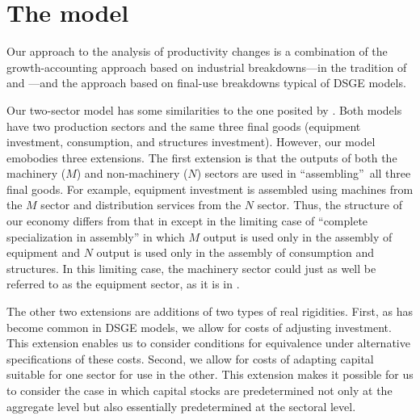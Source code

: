 \documentclass[12pt,fleqn]{article}
\begin{document}
\section{\protect\normalsize The model}

Our approach to the analysis of productivity changes is a
combination of the growth-accounting approach based on industrial
breakdowns---in the tradition of  and %
---and the approach based on final-use breakdowns typical of DSGE models.

Our two-sector model has some similarities to the one posited
by . Both models have two production
sectors and the same three final goods (equipment investment, consumption,
and structures investment). However, our model emobodies three extensions. The first
extension is that the outputs of both the machinery ($M$) and non-machinery ($N$) sectors are used in
\textquotedblleft assembling\textquotedblright\ all three final goods.  For example, equipment investment is
assembled using machines from the $M$ sector and distribution services from
the $N$ sector. Thus, the structure of our economy differs from that in 
except in the limiting case of ``complete specialization in assembly'' in
which $M$ output is used only in the assembly of equipment and $N$ output is
used only in the assembly of consumption and structures. In this limiting
case, the machinery sector could just as well be referred to as the
equipment sector, as it is in .

The other two extensions are additions of two types of real
rigidities. First, as has become common in DSGE models, we allow for costs of adjusting investment.%
 This extension enables us to consider conditions for
equivalence under alternative specifications of these costs.
Second, we allow for costs of adapting capital suitable for one
sector for use in the other. This extension makes it possible for
us to consider the case in which capital stocks are predetermined
not only at the aggregate level but also essentially predetermined at the sectoral level.
\end{document}
